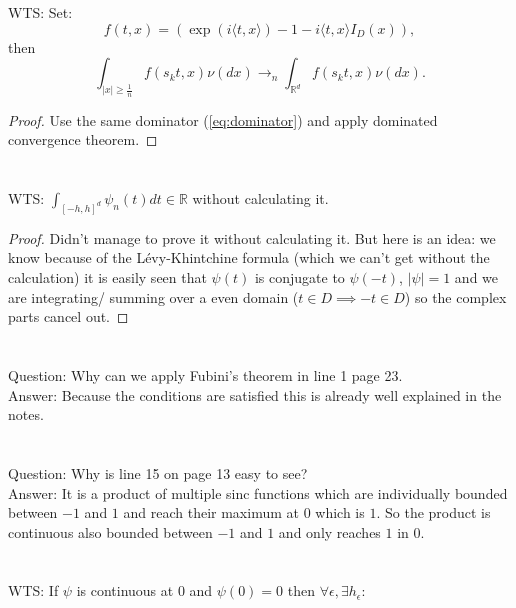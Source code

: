 \documentclass[a4paper,11pt]{article}
\begin{document}
\section{}
WTS:
Set:
\begin{equation}
    f(t,x) =  ( \exp ( i \langle t, x \rangle)-1-i \langle t, x \rangle I_{D} ( x ) ),
\end{equation}
then
\begin{equation}
    \int_{|x| \ge \frac{1}{n} } f(s_{k}t,x) \nu( d x )\rightarrow_{n} \int_{\mathbb{R}^{d}} f(s_{k}t,x) \nu( d x )
    .
\end{equation}
\begin{proof}
    Use the same dominator (\ref{eq:dominator}) and apply dominated convergence theorem.
\end{proof}

\section{}
WTS: $\int_{[-h,h]^{d}} \psi_{n}(t) dt  \in  \mathbb{R}$ without calculating it.
\begin{proof}
    Didn't manage to prove it without calculating it. But here is an idea: we know
    because of the Lévy-Khintchine formula (which we can't get without the calculation) it is
    easily seen that $\psi(t)$ is conjugate to $\psi(-t)$,  $|\psi|=1 $ and we are integrating/ summing over
    a even domain ($t \in D \implies -t \in D$) so the complex parts cancel out.
\end{proof}

\section{}
Question: Why can we apply Fubini's theorem in line 1 page 23. \\
Answer: Because the conditions are satisfied this is already well explained in the notes.

\section{}
Question: Why is line 15 on page 13 easy to see? \\
Answer: It is a product of multiple sinc functions which are individually bounded between $-1$ and $1$
and reach their maximum at $0$ which is $1$. So the product is continuous also bounded between $-1$ and $1$
and only reaches $1$ in $0$.

\section{}
WTS: If $\psi$ is continuous at $0$ and $\psi(0) = 0$ then $\forall \epsilon,\exists h_{\epsilon}:$
\end{document}
